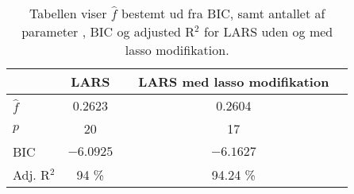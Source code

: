 \begin{table}
\center
\begin{tabular}{lcc | cc} 
\toprule
& \multicolumn{1}{c}{LARS}  && \multicolumn{1}{c}{LARS med lasso modifikation} \\ \midrule
$\widehat{f}$ & 0.2623 & & 0.2604   \\
$p$ & 20 & &  17  \\
BIC & $-6.0925$ && $-6.1627$  \\
Adj. R$^2$ &94 \% & & 94.24 \% \\ \bottomrule
 \end{tabular}
\caption{Tabellen viser $\widehat{f}$ bestemt ud fra BIC, samt antallet af parameter , BIC og adjusted  R$^2$ for LARS uden og med lasso modifikation. } \label{tab:bic_lars}
\end{table}